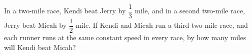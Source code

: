 In a two-mile race, Kendi beat Jerry by $\dfrac{1}{3}$ mile, and in a second two-mile race, Jerry beat Micah by $\dfrac{1}{2}$ mile. If Kendi and Micah run a third two-mile race, and each runner runs at the same constant speed in every race, by how many miles will Kendi beat Micah?
